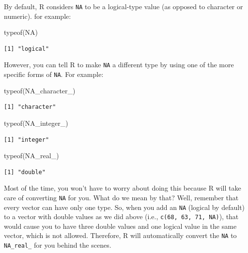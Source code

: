 \documentclass[
  letterpaper,
  DIV=11,
  numbers=noendperiod]{scrreprt}
\newenvironment{Shaded}{\begin{snugshade}}{\end{snugshade}}
\newcommand{\ConstantTok}[1]{\textcolor[rgb]{0.56,0.35,0.01}{#1}}
\newcommand{\FunctionTok}[1]{\textcolor[rgb]{0.28,0.35,0.67}{#1}}
\newcommand{\NormalTok}[1]{\textcolor[rgb]{0.00,0.23,0.31}{#1}}
\begin{document}
By default, R considers \texttt{NA} to be a logical-type value (as
opposed to character or numeric). for example:

\begin{Shaded}
\begin{Highlighting}[]
\FunctionTok{typeof}\NormalTok{(}\ConstantTok{NA}\NormalTok{)}
\end{Highlighting}
\end{Shaded}

\begin{verbatim}
[1] "logical"
\end{verbatim}

However, you can tell R to make \texttt{NA} a different type by using
one of the more specific forms of \texttt{NA}. For example:

\begin{Shaded}
\begin{Highlighting}[]
\FunctionTok{typeof}\NormalTok{(}\ConstantTok{NA\_character\_}\NormalTok{)}
\end{Highlighting}
\end{Shaded}

\begin{verbatim}
[1] "character"
\end{verbatim}

\begin{Shaded}
\begin{Highlighting}[]
\FunctionTok{typeof}\NormalTok{(}\ConstantTok{NA\_integer\_}\NormalTok{)}
\end{Highlighting}
\end{Shaded}

\begin{verbatim}
[1] "integer"
\end{verbatim}

\begin{Shaded}
\begin{Highlighting}[]
\FunctionTok{typeof}\NormalTok{(}\ConstantTok{NA\_real\_}\NormalTok{)}
\end{Highlighting}
\end{Shaded}

\begin{verbatim}
[1] "double"
\end{verbatim}

Most of the time, you won't have to worry about doing this because R
will take care of converting \texttt{NA} for you. What do we mean by
that? Well, remember that every vector can have only one type. So, when
you add an \texttt{NA} (logical by default) to a vector with double
values as we did above (i.e., \texttt{c(68,\ 63,\ 71,\ NA)}), that would
cause you to have three double values and one logical value in the same
vector, which is not allowed. Therefore, R will automatically convert
the \texttt{NA} to \texttt{NA\_real\_} for you behind the scenes.
\end{document}
